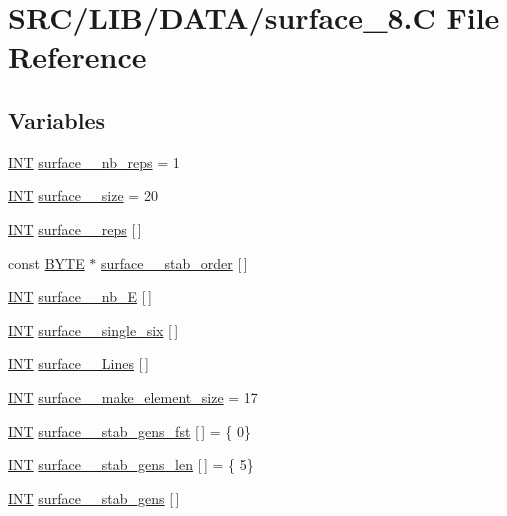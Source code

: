 \hypertarget{surface__8_8_c}{}\section{S\+R\+C/\+L\+I\+B/\+D\+A\+T\+A/surface\+\_\+8.C File Reference}
\label{surface__8_8_c}
\subsection*{Variables}
\begin{DoxyCompactItemize}
\item 
\mbox{\hyperlink{galois_8h_a09fddde158a3a20bd2dcadb609de11dc}{I\+NT}} \mbox{\hyperlink{surface__8_8_c_aeb999cf64475954ab4da3e4211120146}{surface\+\_\+\_\+nb\+\_\+reps}} = 1
\item 
\mbox{\hyperlink{galois_8h_a09fddde158a3a20bd2dcadb609de11dc}{I\+NT}} \mbox{\hyperlink{surface__8_8_c_a789fedd88b77c534ada4af428bc5b121}{surface\+\_\+\_\+size}} = 20
\item 
\mbox{\hyperlink{galois_8h_a09fddde158a3a20bd2dcadb609de11dc}{I\+NT}} \mbox{\hyperlink{surface__8_8_c_acf682eeade17ce4693cc343798f7cf8a}{surface\+\_\+\_\+reps}} \mbox{[}$\,$\mbox{]}
\item 
const \mbox{\hyperlink{galois_8h_ab6cc7b4aeb6ea31aba2b3fbfc83ff5e6}{B\+Y\+TE}} $\ast$ \mbox{\hyperlink{surface__8_8_c_a2857e0f9d933808c8ebbe93e9e54335e}{surface\+\_\+\_\+stab\+\_\+order}} \mbox{[}$\,$\mbox{]}
\item 
\mbox{\hyperlink{galois_8h_a09fddde158a3a20bd2dcadb609de11dc}{I\+NT}} \mbox{\hyperlink{surface__8_8_c_aeff7c70ba961db58d55a34947d28d56f}{surface\+\_\+\_\+nb\+\_\+E}} \mbox{[}$\,$\mbox{]}
\item 
\mbox{\hyperlink{galois_8h_a09fddde158a3a20bd2dcadb609de11dc}{I\+NT}} \mbox{\hyperlink{surface__8_8_c_a241d948b0875ea4f599d5e7615bfb99b}{surface\+\_\+\_\+single\+\_\+six}} \mbox{[}$\,$\mbox{]}
\item 
\mbox{\hyperlink{galois_8h_a09fddde158a3a20bd2dcadb609de11dc}{I\+NT}} \mbox{\hyperlink{surface__8_8_c_ab31e94a76cae99a51f99875f41450298}{surface\+\_\+\_\+\+Lines}} \mbox{[}$\,$\mbox{]}
\item 
\mbox{\hyperlink{galois_8h_a09fddde158a3a20bd2dcadb609de11dc}{I\+NT}} \mbox{\hyperlink{surface__8_8_c_abc9abb03f45cb297bdddecdfa6a304a7}{surface\+\_\+\_\+make\+\_\+element\+\_\+size}} = 17
\item 
\mbox{\hyperlink{galois_8h_a09fddde158a3a20bd2dcadb609de11dc}{I\+NT}} \mbox{\hyperlink{surface__8_8_c_a5094eb8cf20c94cfdd5a5f52e1545b71}{surface\+\_\+\_\+stab\+\_\+gens\+\_\+fst}} \mbox{[}$\,$\mbox{]} = \{ 0\}
\item 
\mbox{\hyperlink{galois_8h_a09fddde158a3a20bd2dcadb609de11dc}{I\+NT}} \mbox{\hyperlink{surface__8_8_c_a9ac9b4be00fbe48f9627b2b51e1aa8cd}{surface\+\_\+\_\+stab\+\_\+gens\+\_\+len}} \mbox{[}$\,$\mbox{]} = \{ 5\}
\item 
\mbox{\hyperlink{galois_8h_a09fddde158a3a20bd2dcadb609de11dc}{I\+NT}} \mbox{\hyperlink{surface__8_8_c_a96cfe6bc9a30da26d82d13c89a5c5647}{surface\+\_\+\_\+stab\+\_\+gens}} \mbox{[}$\,$\mbox{]}
\end{DoxyCompactItemize}


